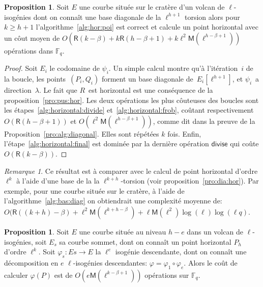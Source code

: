 \documentclass[10pt,a4paper]{book}
\theoremstyle{plain}
\theoremstyle{definition}
\theoremstyle{definition}
\theoremstyle{definition}
\newtheorem{prop}[thm]{Proposition}
\theoremstyle{definition}
\theoremstyle{remark}
\newtheorem{rem}[thm]{Remarque}
\theoremstyle{remark}
\theoremstyle{definition}
\begin{document}
\begin{prop}\label{pro:alg:hor}
Soit $E$ une courbe située sur le cratère d'un volcan de $\ell$-isogénies dont 
on connaît une base diagonale de la $\ell^{h+1}$ torsion alors pour 
$k \geqslant h+1$ l'algorithme~\ref{alg:hor:poi} est correct et calcule un 
point horizontal avec un côut moyen de $O(\mathsf{R}(k-\beta) + k\mathsf{R}(h-\beta+1) + k\ell^2\mathsf{M}(\ell^{h-\beta+1}))$
  opérations dans $\mathbb{F}_q$.
\end{prop}
\begin{proof}
Soit $E_i$ le codomaine de $\psi_i$.
Un simple calcul montre qu'à  l'itération~$i$ de la boucle,
les points~$(P_i, Q_i)$ forment un base diagonale de~$E_i[\ell^{h+1}]$,
et $\psi_i$~a direction~$\lambda$.
Le fait que $R$~est horizontal est une conséquence
de la proposition~\ref{pro:pus:hor}.
Les deux opérations les plus côuteuses des boucles sont les
étapes~\ref{alg:horizontal:divide} et~\ref{alg:horizontal:frob},
coûtant respectivement $O(\mathsf{R}(h-\beta+1))$ et 
$O(\ell^2\mathsf{M}(\ell^{h-\beta+1}))$, comme
dit dans la preuve de la Proposition~\ref{pro:alg:diagonal}. Elles sont 
répétées $k$ fois. Enfin, l'étape~\ref{alg:horizontal:final} est
dominée par la dernière opération $\mathsf{divise}$ qui coûte $O(\mathsf{R}(k-\beta))$.
\end{proof}

\begin{rem}
Ce résultat est à comparer avec le calcul de point horizontal d'ordre $\ell^k$ 
à l'aide d'une base de la la $\ell^{k+h}$-torsion (voir 
proposition~\ref{pro:dia:hor}). Par exemple, pour une 
courbe située sur le cratère, à l'aide de l'algorithme~\ref{alg:bas:diag} on 
obtiendrait une complexité moyenne de: $O(\mathsf{R}((k+h)-\beta)+\ell^{2}
\mathsf{M}(\ell^{k+h-\beta})+\ell\mathsf{M}(\ell^2)\log(\ell)\log(\ell q)$.
\end{rem}

\begin{prop}
\label{pro:par:hor}
Soit $E$ une courbe située au niveau $h-e$ dans un volcan de $\ell$-isogénies, 
soit $E_s$ sa courbe sommet, dont on connaît un point horizontal $P_h$ d'ordre 
$\ell^k$. Soit $\varphi_s:Es \rightarrow E $ la $\ell^{e}$ isogénie descendante,
dont on connaît une décomposition en $e$ $\ell$-isogénies descendantes: 
$\varphi=\varphi_1 \circ \varphi_{e}$. Alors le coût de calculer $\varphi(P)$ 
est de $O(e\mathsf{M}(\ell^{k-\beta+1}))$ opérations sur $\mathbb{F}_q$.
\end{prop}
\end{document}
